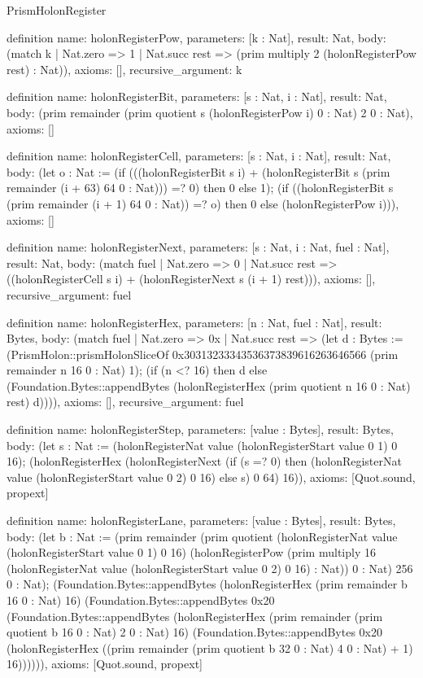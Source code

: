 \begin{lexlean}{PrismHolonRegister}
\begin{semanticmodule}
definition{
  name: holonRegisterPow,
  parameters: [k : Nat],
  result: Nat,
  body: (match k
    | Nat.zero => 1
    | Nat.succ rest => (prim multiply 2 (holonRegisterPow rest) : Nat)),
  axioms: [],
  recursive_argument: k
}

definition{
  name: holonRegisterBit,
  parameters: [s : Nat, i : Nat],
  result: Nat,
  body: (prim remainder (prim quotient s (holonRegisterPow i) 0 : Nat) 2 0 : Nat),
  axioms: []
}

definition{
  name: holonRegisterCell,
  parameters: [s : Nat, i : Nat],
  result: Nat,
  body: (let o : Nat := (if (((holonRegisterBit s i) + (holonRegisterBit s (prim remainder (i + 63) 64 0 : Nat))) =? 0) then 0 else 1); (if ((holonRegisterBit s (prim remainder (i + 1) 64 0 : Nat)) =? o) then 0 else (holonRegisterPow i))),
  axioms: []
}

definition{
  name: holonRegisterNext,
  parameters: [s : Nat, i : Nat, fuel : Nat],
  result: Nat,
  body: (match fuel
    | Nat.zero => 0
    | Nat.succ rest => ((holonRegisterCell s i) + (holonRegisterNext s (i + 1) rest))),
  axioms: [],
  recursive_argument: fuel
}

definition{
  name: holonRegisterHex,
  parameters: [n : Nat, fuel : Nat],
  result: Bytes,
  body: (match fuel
    | Nat.zero => 0x
    | Nat.succ rest => (let d : Bytes := (PrismHolon::prismHolonSliceOf 0x30313233343536373839616263646566 (prim remainder n 16 0 : Nat) 1); (if (n <? 16) then d else (Foundation.Bytes::appendBytes (holonRegisterHex (prim quotient n 16 0 : Nat) rest) d)))),
  axioms: [],
  recursive_argument: fuel
}

definition{
  name: holonRegisterStep,
  parameters: [value : Bytes],
  result: Bytes,
  body: (let s : Nat := (holonRegisterNat value (holonRegisterStart value 0 1) 0 16); (holonRegisterHex (holonRegisterNext (if (s =? 0) then (holonRegisterNat value (holonRegisterStart value 0 2) 0 16) else s) 0 64) 16)),
  axioms: [Quot.sound, propext]
}

definition{
  name: holonRegisterLane,
  parameters: [value : Bytes],
  result: Bytes,
  body: (let b : Nat := (prim remainder (prim quotient (holonRegisterNat value (holonRegisterStart value 0 1) 0 16) (holonRegisterPow (prim multiply 16 (holonRegisterNat value (holonRegisterStart value 0 2) 0 16) : Nat)) 0 : Nat) 256 0 : Nat); (Foundation.Bytes::appendBytes (holonRegisterHex (prim remainder b 16 0 : Nat) 16) (Foundation.Bytes::appendBytes 0x20 (Foundation.Bytes::appendBytes (holonRegisterHex (prim remainder (prim quotient b 16 0 : Nat) 2 0 : Nat) 16) (Foundation.Bytes::appendBytes 0x20 (holonRegisterHex ((prim remainder (prim quotient b 32 0 : Nat) 4 0 : Nat) + 1) 16)))))),
  axioms: [Quot.sound, propext]
}


\end{semanticmodule}
\end{lexlean}
